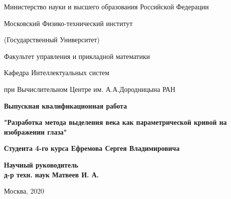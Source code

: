 \documentclass[12pt,a4paper]{article} %
\begin{document}
	
\vskip 3mm

\setcounter{page}{1}
\begin{center}
	\thispagestyle{empty}
	
	{ Министерство науки и высшего образования Российской Федерации\\}

	
	
	{ Московский Физико-технический институт \\}
	
	{ (Государственный Университет) \\}
	
	{ Факультет управления и прикладной математики  \\}
	
	{ Кафедра Интеллектуальных систем\\}
	
	{при Вычислительном Центре им. А.А.Дородницына РАН\\ [4cm]}
	
	{ \bf \Large Выпускная квалификационная работа\\}
	
	{ \bf \Large{"Разработка метода выделения века как параметрической кривой на изображении глаза"\\[1cm]} }
	
	{\bf {Студента 4-го курса Ефремова Сергея Владимировича}\\[3cm]}
	
\end{center}

\begin{flushright}
	\bf{Научный руководитель}\\
	\bf{д-р техн. наук Матвеев И. А.}\\[4cm]
\end{flushright}


\begin{center}
	Москва, 2020
\end{center}

\newpage
\begin{abstract}

В данной работе рассматривается задача выделения века на изображении глаза как параметрической кривой. Исследованы предложенные ранее схемы решения этой проблемы, и на основе изученных материалов разработан подход по его выделению как параболы с помощью поиска максимума на множестве проекций. Предложен и реализован алгоритм, основанный на параболическом преобразовании и преобразовании Радона.	

\end{abstract}
\end{document}
